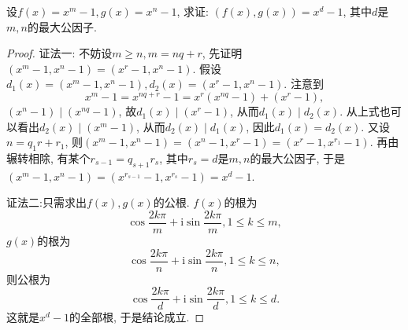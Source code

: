\documentclass[../../main.tex]{subfiles}%
\begin{document}
\begin{proposition}\label{proposition:n方差的最大公因式}
设\(f(x)=x^m - 1, g(x)=x^n - 1\), 求证: \((f(x),g(x))=x^d - 1\), 其中\(d\)是\(m,n\)的最大公因子.
\end{proposition}
\begin{proof}

{\color{blue}证法一:}
不妨设\(m\geqslant  n, m = nq + r\), 先证明\((x^m - 1,x^n - 1)=(x^r - 1,x^n - 1)\). 假设\(d_1(x)=(x^m - 1,x^n - 1), d_2(x)=(x^r - 1,x^n - 1)\). 注意到
\[
x^m - 1=x^{nq + r}-1=x^r(x^{nq}-1)+(x^r - 1),
\]
\((x^n - 1)\mid(x^{nq}-1)\), 故\(d_1(x)\mid(x^r - 1)\), 从而\(d_1(x)\mid d_2(x)\). 从上式也可以看出\(d_2(x)\mid(x^m - 1)\), 从而\(d_2(x)\mid d_1(x)\), 因此\(d_1(x)=d_2(x)\). 又设\(n = q_1r + r_1\), 则\((x^m - 1,x^n - 1)=(x^n - 1,x^r - 1)=(x^r - 1,x^{r_1}-1)\). 再由辗转相除, 有某个\(r_{s - 1}=q_{s + 1}r_s\), 其中\(r_s = d\)是\(m,n\)的最大公因子, 于是\((x^m - 1,x^n - 1)=(x^{r_{s - 1}}-1,x^{r_s}-1)=x^d - 1\).

{\color{blue}证法二:}只需求出\(f(x),g(x)\)的公根. \(f(x)\)的根为
\[
\cos\frac{2k\pi}{m}+\mathrm{i}\sin\frac{2k\pi}{m}, 1\leqslant  k\leqslant  m,
\]
\(g(x)\)的根为
\[
\cos\frac{2k\pi}{n}+\mathrm{i}\sin\frac{2k\pi}{n}, 1\leqslant  k\leqslant  n,
\]
则公根为
\[
\cos\frac{2k\pi}{d}+\mathrm{i}\sin\frac{2k\pi}{d}, 1\leqslant  k\leqslant  d.
\]
这就是\(x^d - 1\)的全部根, 于是结论成立.
\end{proof}
\end{document}

